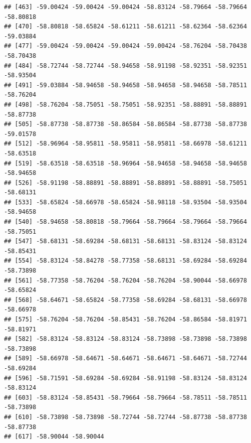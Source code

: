 \documentclass[
]{article}
\newenvironment{Shaded}{\begin{snugshade}}{\end{snugshade}}
\newcommand{\CommentTok}[1]{\textcolor[rgb]{0.56,0.35,0.01}{\textit{#1}}}
\newcommand{\DecValTok}[1]{\textcolor[rgb]{0.00,0.00,0.81}{#1}}
\newcommand{\FloatTok}[1]{\textcolor[rgb]{0.00,0.00,0.81}{#1}}
\newcommand{\FunctionTok}[1]{\textcolor[rgb]{0.00,0.00,0.00}{#1}}
\newcommand{\NormalTok}[1]{#1}
\newcommand{\OtherTok}[1]{\textcolor[rgb]{0.56,0.35,0.01}{#1}}
\newcommand{\SpecialCharTok}[1]{\textcolor[rgb]{0.00,0.00,0.00}{#1}}
\begin{document}
\begin{verbatim}
## [463] -59.00424 -59.00424 -59.00424 -58.83124 -58.79664 -58.79664 -58.80818
## [470] -58.80818 -58.65824 -58.61211 -58.61211 -58.62364 -58.62364 -59.03884
## [477] -59.00424 -59.00424 -59.00424 -59.00424 -58.76204 -58.70438 -58.70438
## [484] -58.72744 -58.72744 -58.94658 -58.91198 -58.92351 -58.92351 -58.93504
## [491] -59.03884 -58.94658 -58.94658 -58.94658 -58.94658 -58.78511 -58.76204
## [498] -58.76204 -58.75051 -58.75051 -58.92351 -58.88891 -58.88891 -58.87738
## [505] -58.87738 -58.87738 -58.86584 -58.86584 -58.87738 -58.87738 -59.01578
## [512] -58.96964 -58.95811 -58.95811 -58.95811 -58.66978 -58.61211 -58.63518
## [519] -58.63518 -58.63518 -58.96964 -58.94658 -58.94658 -58.94658 -58.94658
## [526] -58.91198 -58.88891 -58.88891 -58.88891 -58.88891 -58.75051 -58.68131
## [533] -58.65824 -58.66978 -58.65824 -58.98118 -58.93504 -58.93504 -58.94658
## [540] -58.94658 -58.80818 -58.79664 -58.79664 -58.79664 -58.79664 -58.75051
## [547] -58.68131 -58.69284 -58.68131 -58.68131 -58.83124 -58.83124 -58.85431
## [554] -58.83124 -58.84278 -58.77358 -58.68131 -58.69284 -58.69284 -58.73898
## [561] -58.77358 -58.76204 -58.76204 -58.76204 -58.90044 -58.66978 -58.65824
## [568] -58.64671 -58.65824 -58.77358 -58.69284 -58.68131 -58.66978 -58.66978
## [575] -58.76204 -58.76204 -58.85431 -58.76204 -58.86584 -58.81971 -58.81971
## [582] -58.83124 -58.83124 -58.83124 -58.73898 -58.73898 -58.73898 -58.73898
## [589] -58.66978 -58.64671 -58.64671 -58.64671 -58.64671 -58.72744 -58.69284
## [596] -58.71591 -58.69284 -58.69284 -58.91198 -58.83124 -58.83124 -58.83124
## [603] -58.83124 -58.85431 -58.79664 -58.79664 -58.78511 -58.78511 -58.73898
## [610] -58.73898 -58.73898 -58.72744 -58.72744 -58.87738 -58.87738 -58.87738
## [617] -58.90044 -58.90044
\end{verbatim}

\begin{Shaded}
\end{Shaded}
\end{document}
